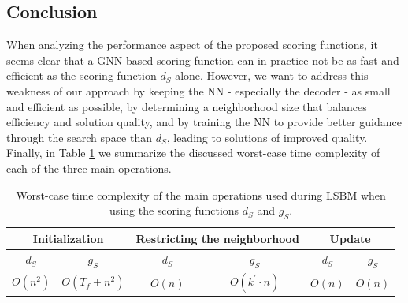 \documentclass[draft,final]{vutinfth} %
\begin{document}
\subsection{Conclusion}
When analyzing the performance aspect of the proposed scoring functions, it seems clear that a GNN-based scoring function can in practice not be as fast and efficient as the scoring function $d_S$ alone. However, we want to address this weakness of our approach by keeping the NN - especially the decoder - as small and efficient as possible, by determining a neighborhood size that balances efficiency and solution quality, and by training the NN to provide better guidance through the search space than $d_S$, leading to solutions of improved quality. Finally, in Table \ref{tab:runtime-analysis} we summarize the discussed worst-case time complexity of each of the three main operations. 

\begin{table}
    \centering
    \begin{tabular}{cc | cc | cc}
        \toprule
        \multicolumn{2}{c}{Initialization} & \multicolumn{2}{c}{Restricting the neighborhood} & \multicolumn{2}{c}{Update}  \\ \hline
        $d_S$ & $g_S$ & $d_S$ & $g_S$ & $d_S$ & $g_S$  \\ 
        $O(n^2)$ & $O(T_f + n^2)$ & $O(n)$ & $O(k^\prime \cdot n)$ & $O(n)$ & $O(n)$ 
    \end{tabular}
    \caption{Worst-case time complexity of the main operations used during LSBM when using the scoring functions $d_S$ and $g_S$. }
    \label{tab:runtime-analysis}
\end{table}


\end{document}
